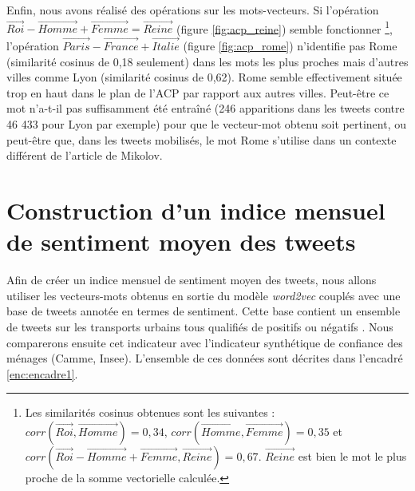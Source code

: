 \documentclass[11pt,french,french]{article}
\let\rmarkdownfootnote\footnote%
\def\footnote{\protect\rmarkdownfootnote}
\begin{document}
Enfin, nous avons réalisé des opérations sur les mots-vecteurs.
Si l'opération \(\overrightarrow{Roi} - \overrightarrow{Homme} + \overrightarrow{Femme} = \overrightarrow{Reine}\) (figure \ref{fig:acp_reine}) semble fonctionner
\footnote{Les similarités cosinus obtenues sont les suivantes : \(corr(\overrightarrow{Roi}, \overrightarrow{Homme}) = 0,34\), \(corr(\overrightarrow{Homme}, \overrightarrow{Femme}) = 0,35\) et \(corr(\overrightarrow{Roi} - \overrightarrow{Homme} + \overrightarrow{Femme} , \overrightarrow{Reine}) = 0,67\). \(\overrightarrow{Reine}\) est bien le mot le plus proche de la somme vectorielle calculée.}, l'opération \(\overrightarrow{Paris} - \overrightarrow{France} + \overrightarrow{Italie}\) (figure \ref{fig:acp_rome}) n'identifie pas \og Rome \fg{} (similarité cosinus de 0,18 seulement) dans les mots les plus proches mais d'autres villes comme \og Lyon \fg{} (similarité cosinus de 0,62).
\og Rome \fg{} semble effectivement située \og trop en haut\fg{} dans le plan de l'ACP par rapport aux autres villes.
Peut-être ce mot n'a-t-il pas suffisamment été entraîné (246 apparitions dans les tweets contre 46 433 pour Lyon par exemple) pour que le vecteur-mot obtenu soit pertinent, ou peut-être que, dans les tweets mobilisés, le mot \og Rome \fg{} s'utilise dans un contexte différent de l'article de Mikolov.

\hypertarget{sec:sentimentalAnalysis}{%
\section{Construction d'un indice mensuel de sentiment moyen des tweets}\label{sec:sentimentalAnalysis}}

Afin de créer un indice mensuel de sentiment moyen des tweets, nous allons utiliser les vecteurs-mots obtenus en sortie du modèle \emph{word2vec} couplés avec une base de tweets annotée en termes de sentiment. Cette base contient un ensemble de tweets sur les transports urbains tous qualifiés de positifs ou négatifs .
Nous comparerons ensuite cet indicateur avec l'indicateur synthétique de confiance des ménages (Camme, Insee).
L'ensemble de ces données sont décrites dans l'encadré \ref{enc:encadre1}.
\end{document}
